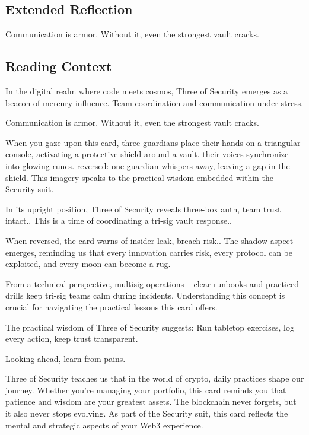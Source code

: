 \documentclass[11pt,oneside]{book}
\begin{document}
\begin{minipage}[t]{0.55\textwidth}
  \subsection*{Extended Reflection}
  Communication is armor. Without it, even the strongest vault cracks.

  \subsection*{Reading Context}
  In the digital realm where code meets cosmos, Three of Security emerges as a beacon of mercury influence. Team coordination and communication under stress.

  Communication is armor. Without it, even the strongest vault cracks.

  When you gaze upon this card, three guardians place their hands on a triangular console, activating a protective shield around a vault. their voices synchronize into glowing runes. reversed: one guardian whispers away, leaving a gap in the shield. This imagery speaks to the practical wisdom embedded within the Security suit.

  In its upright position, Three of Security reveals three-box auth, team trust intact.. This is a time of coordinating a tri-sig vault response..

  When reversed, the card warns of insider leak, breach risk.. The shadow aspect emerges, reminding us that every innovation carries risk, every protocol can be exploited, and every moon can become a rug.

  From a technical perspective, multisig operations – clear runbooks and practiced drills keep tri-sig teams calm during incidents. Understanding this concept is crucial for navigating the practical lessons this card offers.

  The practical wisdom of Three of Security suggests: Run tabletop exercises, log every action, keep trust transparent.

  Looking ahead, learn from pains.

  Three of Security teaches us that in the world of crypto, daily practices shape our journey. Whether you're managing your portfolio, this card reminds you that patience and wisdom are your greatest assets. The blockchain never forgets, but it also never stops evolving. As part of the Security suit, this card reflects the mental and strategic aspects of your Web3 experience.

\end{minipage}
\end{document}
